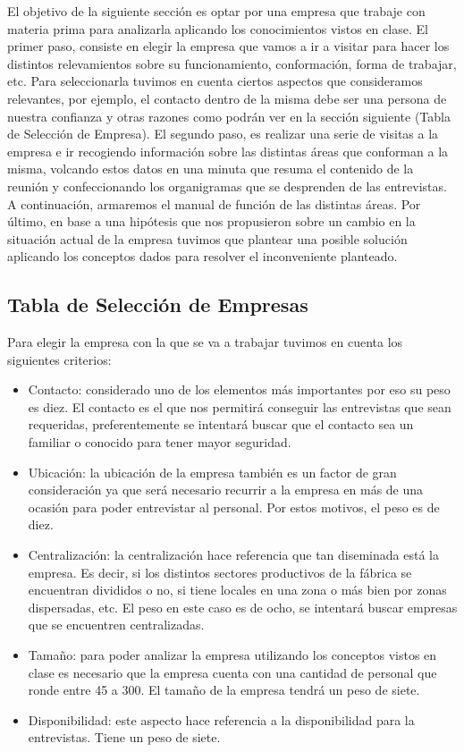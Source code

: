 \documentclass[a4paper,10pt,titlepage]{article}
\begin{document}
El objetivo de la siguiente sección es optar por una empresa que trabaje con materia prima para analizarla aplicando los conocimientos vistos en clase. 
El primer paso, consiste en elegir la empresa que vamos a ir a visitar para hacer los distintos relevamientos sobre su funcionamiento, conformación, forma de trabajar, etc. 
Para seleccionarla tuvimos en cuenta ciertos aspectos que consideramos relevantes, por ejemplo, el contacto dentro de la misma debe ser una persona de nuestra confianza y otras razones como podrán ver en la sección siguiente (Tabla de Selección de Empresa). 
El segundo paso, es realizar una serie de visitas a la empresa e ir recogiendo información sobre las distintas áreas que conforman a la misma, volcando estos datos en una minuta que resuma el contenido de la reunión y confeccionando los organigramas que se desprenden de las entrevistas. 
A continuación, armaremos el manual de función de las distintas áreas.
Por último, en base a una hipótesis que nos propusieron sobre un cambio en la situación actual de la empresa tuvimos que plantear una posible solución aplicando los conceptos dados para resolver el inconveniente planteado. 


\newpage

\subsection{Tabla de Selecci\'on de Empresas}

Para elegir la empresa con la que se va a trabajar tuvimos en cuenta los siguientes criterios:
\begin{itemize}
\item Contacto: considerado uno de los elementos más importantes por eso su peso es diez. El contacto es el que nos permitirá conseguir las entrevistas que sean requeridas, preferentemente se intentará buscar que el contacto sea un familiar o conocido para tener mayor seguridad. 
\item Ubicación: la ubicación de la empresa también es un factor de gran consideración ya que será necesario recurrir a la empresa en más de una ocasión para poder entrevistar al personal. Por estos motivos, el peso es de diez.
\item Centralización: la centralización hace referencia que tan diseminada está la empresa. Es decir, si los distintos sectores productivos de la fábrica se encuentran divididos o no, si tiene locales en una zona o más bien por zonas dispersadas, etc. El peso en este caso es de ocho, se intentará buscar empresas que se encuentren centralizadas. 
\item Tamaño: para poder analizar la empresa utilizando los conceptos vistos en clase es necesario que la empresa cuenta con una cantidad de personal que ronde entre 45 a 300. El tamaño de la empresa tendrá un peso de siete.
\item Disponibilidad: este aspecto hace referencia a la disponibilidad para la entrevistas. Tiene un peso de siete.
\end{itemize}
\end{document}
